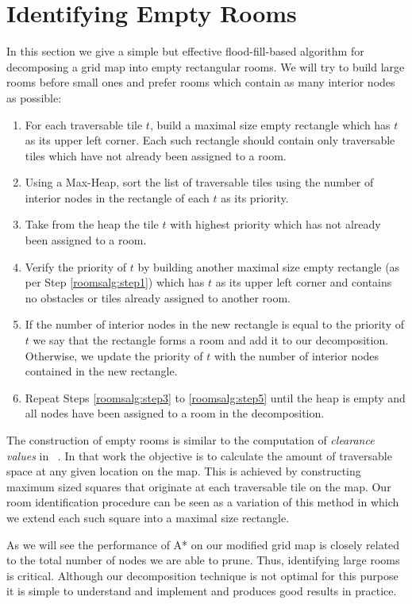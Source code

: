 \section{Identifying Empty Rooms}
\label{empty rooms}
In this section we give a simple but effective flood-fill-based algorithm for decomposing a 
grid map into empty rectangular rooms.
We will try to build large rooms before small ones and prefer rooms which
contain as many interior nodes as possible:

\begin{enumerate}

\item{\label{roomsalg:step1} For each traversable tile $t$, build a maximal size empty
rectangle which has $t$ as its upper left corner. Each such rectangle should contain only
traversable tiles which have not already been assigned to a room.}

\item{\label{roomsalg:step2} Using a Max-Heap, sort the list of traversable tiles using the number of
interior nodes in the rectangle of each $t$ as its priority.}

\item{\label{roomsalg:step3} Take from the heap the tile $t$ with highest priority
which has not already been assigned to a room. }

\item{\label{rommsalg:step4} Verify the priority of $t$ by building another maximal size
empty rectangle (as per Step \ref{roomsalg:step1}) which has $t$ as its upper
left corner and contains no obstacles or tiles already assigned to another room.}

\item{\label{roomsalg:step5} If the number of interior nodes in the new rectangle is equal to the 
priority of $t$ we say that the rectangle forms a room and add it to our decomposition. 
Otherwise, we update the priority of $t$ with the number of interior 
nodes contained in the new rectangle. }

\item{\label{roomsalg:step6} Repeat Steps \ref{roomsalg:step3} to \ref{roomsalg:step5} until the heap is
empty and all nodes have been assigned to a room in the decomposition.}

\end{enumerate}

The construction of empty rooms is similar to the computation of \emph{clearance
values} in \citeauthor{harabor08}~. 
In that work the objective is to calculate the amount of traversable space
at any given location on the map.
This is achieved by constructing maximum sized squares that originate at each
traversable tile on the map.
Our room identification procedure can be seen as a variation of this method in which we extend each
such square into a maximal size rectangle. 
\par
As we will see the performance of A* on our modified grid map is closely related to the total 
number of nodes we are able to prune.
Thus, identifying large rooms is critical.
Although our decomposition technique is not optimal for this purpose it is simple
to understand and implement and produces good results in practice.
